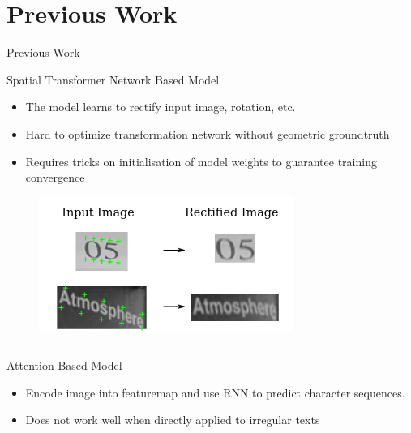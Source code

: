 \documentclass[compress]{beamer}
\begin{document}
\section{Previous Work}
\begin{frame}[allowframebreaks]{Previous Work}
    \begin{block}{Spatial Transformer Network Based Model}
        \begin{itemize}
            \item The model learns to rectify input image, rotation, etc.
            \item Hard to optimize transformation network without geometric groundtruth
            \item Requires tricks on initialisation of model weights to guarantee training convergence
        \end{itemize}
    \end{block}
    \begin{figure}
        \includegraphics[height=.5\textheight]{rectify}
    \end{figure}
    \framebreak
    \begin{columns}
        \begin{column}[T]{.5\textwidth}
            \begin{block}{Attention Based Model}
                \begin{itemize}
                    \item Encode image into featuremap and use RNN to predict character sequences.
                    \item Does not work well when directly applied to irregular texts
                \end{itemize}


\end{block}
\end{column}
\end{columns}
\end{frame}
\end{document}
